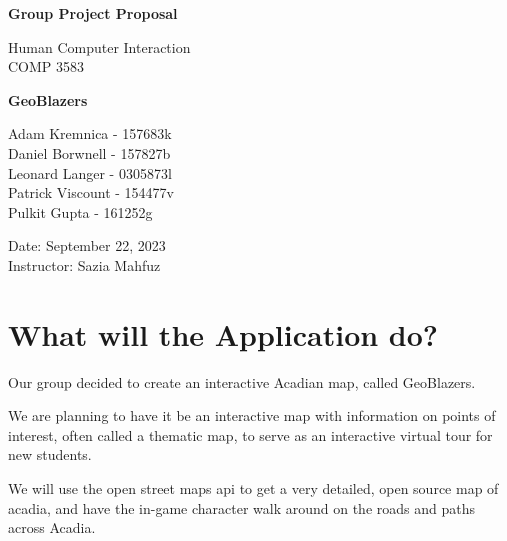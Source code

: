 \documentclass[ansiapaper,12pt]{article}
\begin{document}
\begin{titlepage}
    \begin{center}
        \vspace{2.5cm}

        \Huge
        \textbf{Group Project Proposal}

        \vspace{0.5cm}
        \LARGE
        Human Computer Interaction\\
        COMP 3583

        \vspace{1.5cm}

        \textbf{GeoBlazers}

        \vfill
        \large

        Adam Kremnica - 157683k\\
        Daniel Borwnell - 157827b\\
        Leonard Langer - 0305873l\\
        Patrick Viscount - 154477v\\
        Pulkit Gupta - 161252g

        \vspace{0.8cm}

        \Large
        Date: September 22, 2023\\ %
        Instructor: Sazia Mahfuz\\

        \vspace{0.5cm}
    \end{center}
\end{titlepage}

\tableofcontents
\newpage

\section{What will the Application do?}

Our group decided to create an interactive Acadian map, called GeoBlazers.

We are planning to have it be an interactive map with information on points of interest,
often called a thematic map,
to serve as an interactive virtual tour for new students.

We will use the open street maps api to get a very detailed,
open source map of acadia,
and have the in-game character walk around on the roads and paths across Acadia.
\end{document}
